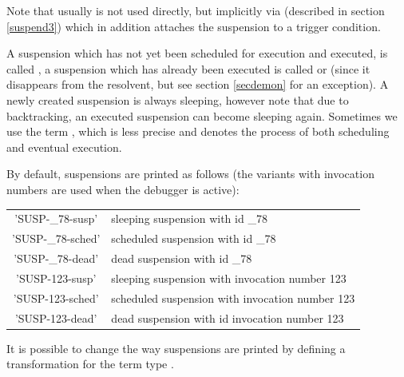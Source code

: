 Note that usually
is not used directly, but implicitly via
(described in section \ref{suspend3}) which in addition attaches the suspension
to a
trigger condition.

A suspension which has not yet been scheduled
for execution and executed, is called
,
a suspension which has already been executed is called
or
(since it disappears from the resolvent,
but see section \ref{secdemon} for an exception).
A newly created suspension is always sleeping, however
note that due to backtracking, an executed suspension
can become sleeping again.
Sometimes we use the term
,
which is less precise and
denotes the process of both scheduling and eventual execution.


By default, suspensions are printed as follows (the variants with invocation
numbers are used when the debugger is active):
\begin{center}
\begin{tabular}{|c|l|}
\hline
'SUSP-_78-susp'		&   sleeping suspension with id _78 \\
'SUSP-_78-sched'	&   scheduled suspension with id _78 \\
'SUSP-_78-dead'		&   dead suspension with id _78 \\
\hline
'SUSP-123-susp'		&   sleeping suspension with invocation number 123 \\
'SUSP-123-sched'	&   scheduled suspension with invocation number 123 \\
'SUSP-123-dead'		&   dead suspension with id invocation number 123 \\
\hline
\end{tabular}
\end{center}
It is possible to change the way suspensions are printed by defining a
transformation for the term type .



